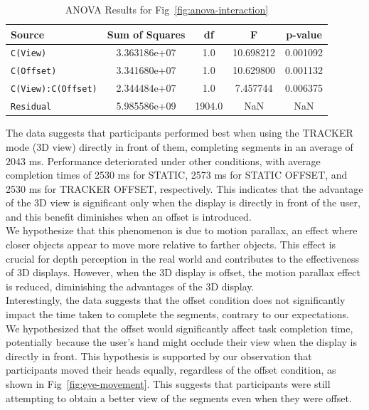 \begin{table}[h!]
	\centering
	\caption{ANOVA Results for Fig~\ref{fig:anova-interaction}}
	\label{tab:anova}
	\begin{tabular}{lS[table-format=1.2e+2]S[table-format=4.0]S[table-format=2.6]S[table-format=1.6]}
		\toprule
		\textbf{Source} & \textbf{Sum of Squares} & \textbf{df} & \textbf{F} & \textbf{p-value} \\
		\midrule
		\texttt{C(View)} & 3.363186e+07 & 1.0 & 10.698212 & 0.001092 \\
		\texttt{C(Offset)} & 3.341680e+07 & 1.0 & 10.629800 & 0.001132 \\
		\texttt{C(View):C(Offset)} & 2.344484e+07 & 1.0 & 7.457744 & 0.006375 \\
		\texttt{Residual} & 5.985586e+09 & 1904.0 & NaN & NaN \\
		\bottomrule
	\end{tabular}
\end{table}

The data suggests that participants performed best when using the TRACKER mode (3D view) directly in front of them, completing segments in an average of 2043 ms. Performance deteriorated under other conditions, with average completion times of 2530 ms for STATIC, 2573 ms for STATIC OFFSET, and 2530 ms for TRACKER OFFSET, respectively. This indicates that the advantage of the 3D view is significant only when the display is directly in front of the user, and this benefit diminishes when an offset is introduced. \\

We hypothesize that this phenomenon is due to motion parallax, an effect where closer objects appear to move more relative to farther objects. This effect is crucial for depth perception in the real world and contributes to the effectiveness of 3D displays. However, when the 3D display is offset, the motion parallax effect is reduced, diminishing the advantages of the 3D display. \\

Interestingly, the data suggests that the offset condition does not significantly impact the time taken to complete the segments, contrary to our expectations. We hypothesized that the offset would significantly affect task completion time, potentially because the user's hand might occlude their view when the display is directly in front. This hypothesis is supported by our observation that participants moved their heads equally, regardless of the offset condition, as shown in Fig~\ref{fig:eye-movement}. This suggests that participants were still attempting to obtain a better view of the segments even when they were offset. \\

